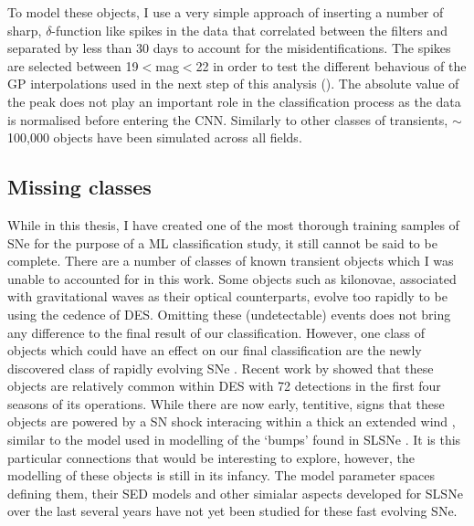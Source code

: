 \begin{figure}
  \caption{}
  \label{fig:BadSubtractions}
\end{figure}

To model these objects, I use a very simple approach of inserting a number of sharp, $\delta$-function like spikes in the data that correlated between the filters and separated by less than 30 days to account for the misidentifications. The spikes are selected between 19$<$mag$<$22 in order to test the different behavious of the GP interpolations used in the next step of this analysis (). The absolute value of the peak does not play an important role in the classification process as the data is normalised before entering the CNN. Similarly to other classes of transients, $\sim$100,000 objects have been simulated across all fields.

\subsection{Missing classes}
While in this thesis, I have created one of the most thorough training samples of SNe for the purpose of a ML classification study, it still cannot be said to be complete. There are a number of classes of known transient objects which I was unable to accounted for in this work. Some objects such as kilonovae, associated with gravitational waves as their optical counterparts, evolve too rapidly to be using the cedence of DES. Omitting these (undetectable) events does not bring any difference to the final result of our classification. However, one class of objects which could have an effect on our final classification are the newly discovered class of rapidly evolving SNe \cite{Drout2014,Kepler2018}. Recent work by \citet{Pursiainen2018} showed that these objects are relatively common within DES with 72 detections in the first four seasons of its operations. While there are now early, tentitive, signs \citep{Pursiainen2018} that these objects are powered by a SN shock interacing within a thick an extended wind \citep{Piro2015}, similar to the model used in modelling of the `bumps' found in SLSNe . It is this particular connections that would be interesting to explore, however, the modelling of these objects is still in its infancy. The model parameter spaces defining them, their SED models and other simialar aspects developed for SLSNe over the last several years have not yet been studied for these fast evolving SNe.

